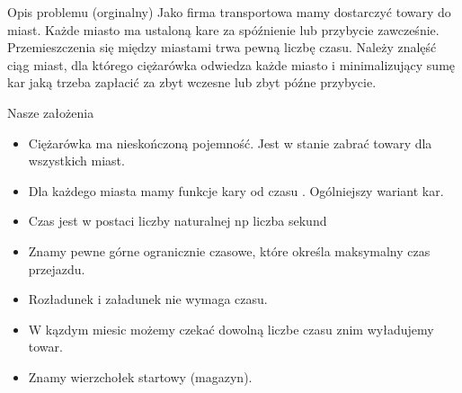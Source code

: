 \begin{frame}
	\begin{block}{Opis problemu (orginalny)}
		Jako firma transportowa mamy dostarczyć towary do miast. 
		Każde miasto ma ustaloną kare za spóźnienie lub przybycie zawcześnie. 
		Przemieszczenia się między miastami trwa pewną liczbę czasu.
		Należy znalęść ciąg miast, dla którego ciężarówka odwiedza każde miasto i minimalizujący sumę kar jaką trzeba zapłacić za zbyt wczesne lub zbyt późne przybycie.
	\end{block}
\end{frame}

\begin{frame}
	\begin{block}{Nasze założenia}
		\begin{itemize}
			\item Ciężarówka ma nieskończoną pojemność.
			      Jest w stanie zabrać towary dla wszystkich miast.
			\item Dla każdego miasta mamy funkcje kary od czasu .
			      Ogólniejszy wariant kar.
			\item Czas jest w postaci liczby naturalnej 
			      np liczba sekund
			\item Znamy pewne górne ogranicznie czasowe, które określa maksymalny czas przejazdu.			   
			\item Rozładunek i załadunek nie wymaga czasu.
			\item W kązdym miesic możemy czekać dowolną liczbe czasu znim wyładujemy towar.
			\item Znamy wierzchołek startowy (magazyn).
		\end{itemize}
	\end{block}
\end{frame}

